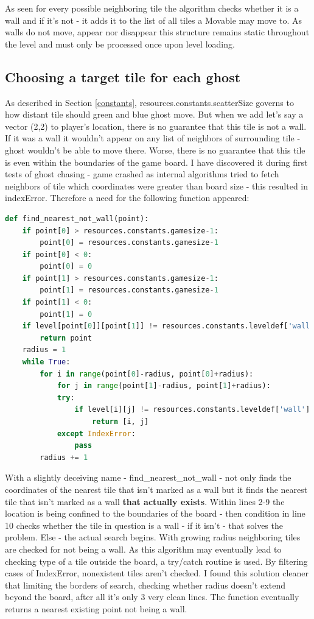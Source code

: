 \documentclass[11pt,a4paper,notitlepage]{report}
\newcommand{\dsubsection}[1]{\FloatBarrier \subsection{#1}}
\begin{document}
				As seen for every possible neighboring tile the algorithm checks whether it is a wall and if it's not - it adds it to the list of all tiles a Movable may move to. As walls do not move, appear nor disappear this structure remains static throughout the level and must only be processed once upon level loading.
			\dsubsection{Choosing a target tile for each ghost}
				As described in Section \ref{constants}, resources.constants.scatterSize governs to how distant tile should green and blue ghost move. But when we add let's say a vector (2,2) to player's location, there is no guarantee that this tile is not a wall. If it was a wall it wouldn't appear on any list of neighbors of surrounding tile - ghost wouldn't be able to move there. Worse, there is no guarantee that this tile is even within the boundaries of the game board. I have discovered it during first tests of ghost chasing - game crashed as internal algorithms tried to fetch neighbors of tile which coordinates were greater than board size - this resulted in indexError. Therefore a need for the following function appeared:
				\begin{lstlisting}[language = Python]
def find_nearest_not_wall(point):
	if point[0] > resources.constants.gamesize-1:
		point[0] = resources.constants.gamesize-1
	if point[0] < 0:
		point[0] = 0
	if point[1] > resources.constants.gamesize-1:
		point[1] = resources.constants.gamesize-1
	if point[1] < 0:
		point[1] = 0
	if level[point[0]][point[1]] != resources.constants.leveldef['wall']:
		return point
	radius = 1
	while True:
		for i in range(point[0]-radius, point[0]+radius):
			for j in range(point[1]-radius, point[1]+radius):
			try:
				if level[i][j] != resources.constants.leveldef['wall']:
					return [i, j]
			except IndexError:
				pass
		radius += 1
				\end{lstlisting}
				With a slightly deceiving name - find\_nearest\_not\_wall - not only finds the coordinates of the nearest tile that isn't marked as a wall but it finds the nearest tile that isn't marked as a wall \textbf{that actually exists}.
				Within lines 2-9 the location is being confined to the boundaries of the board - then condition in line 10 checks whether the tile in question is a wall - if it isn't - that solves the problem. Else - the actual search begins. With growing radius neighboring tiles are checked for not being a wall. As this algorithm may eventually lead to checking type of a tile outside the board, a try/catch routine is used. By filtering cases of IndexError, nonexistent tiles aren't checked. I found this solution cleaner that limiting the borders of search, checking whether radius doesn't extend beyond the board, after all it's only 3 very clean lines. The function eventually returns a nearest existing point not being a wall.
\end{document}
